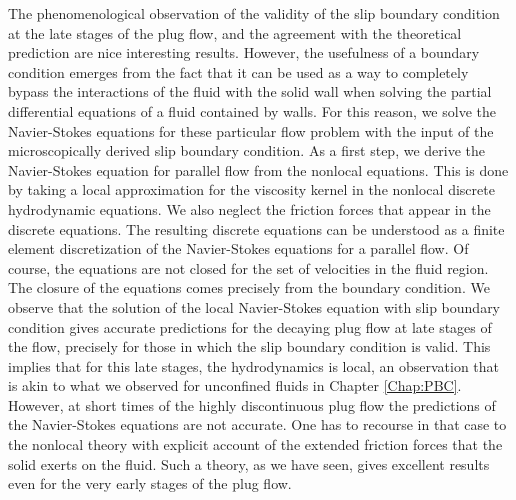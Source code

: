 \documentclass[b5paper,openright,10pt]{book}
\begin{document}
The phenomenological observation of the  validity of the slip boundary
condition at the late stages of  the plug flow, and the agreement with
the theoretical prediction are  nice interesting results. However, the
usefulness of a  boundary condition emerges from the fact  that it can
be used  as a way to  completely bypass the interactions  of the fluid
with the solid wall when solving the partial differential equations of
a  fluid  contained   by  walls.   For  this  reason,   we  solve  the
Navier-Stokes  equations for  these particular  flow problem  with the
input of  the microscopically derived  slip boundary condition.   As a
first step,  we derive  the Navier-Stokes  equation for  parallel flow
from  the  nonlocal  equations.   This  is done  by  taking  a  local
approximation  for  the viscosity  kernel  in  the nonlocal  discrete
hydrodynamic  equations.  We  also  neglect the  friction forces  that
appear in the discrete equations. The resulting discrete equations can
be understood as a finite  element discretization of the Navier-Stokes
equations for a parallel flow. Of course, the equations are not closed
for the  set of velocities  in the fluid  region.  The closure  of the
equations comes precisely from the boundary condition. We observe that
the solution  of the local  Navier-Stokes equation with  slip boundary
condition gives  accurate predictions  for the  decaying plug  flow at
late  stages of  the  flow,  precisely for  those  in  which the  slip
boundary condition is  valid. This implies that for  this late stages,
the hydrodynamics  is local, an  observation that  is akin to  what we
observed for unconfined fluids in Chapter \ref{Chap:PBC}. However, at short times of
the   highly  discontinuous   plug   flow  the   predictions  of   the
Navier-Stokes equations are not accurate. One has to recourse in that case to
the nonlocal  theory with explicit  account of the  extended friction
forces that the solid  exerts on the fluid. Such a  theory, as we have
seen, gives  excellent results even for  the very early stages  of the
plug flow.
\end{document}
